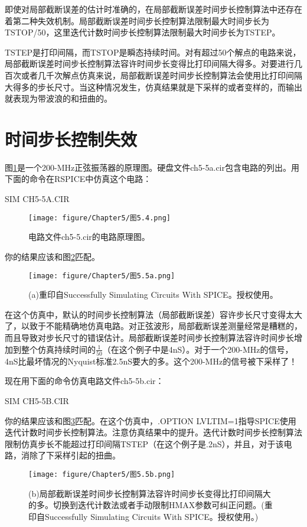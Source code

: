 即使对局部截断误差的估计时准确的，在局部截断误差时间步长控制算法中还存在着第二种失效机制。局部截断误差时间步长控制算法限制最大时间步长为TSTOP/50，这里迭代计数时间步长控制算法限制最大时间步长为TSTEP。

TSTEP是打印间隔，而TSTOP是瞬态持续时间。对有超过50个解点的电路来说，局部截断误差时间步长控制算法容许时间步长变得比打印间隔大得多。对要进行几百次或者几千次解点仿真来说，局部截断误差时间步长控制算法会使用比打印间隔大得多的步长尺寸。当这种情况发生，仿真结果就是下采样的或者变样的，而输出就表现为带波浪的和扭曲的。

\section{时间步长控制失效}
图\ref{图5.4}是一个200-MHz正弦振荡器的原理图。硬盘文件ch5-5a.cir包含电路的列出。用下面的命令在RSPICE中仿真这个电路：

SIM CH5-5A.CIR

\begin{figure}[htbp]
\small
    \centering
    \texttt{[image: figure/Chapter5/图5.4.png]}
    \caption{电路文件ch5-5.cir的电路原理图。}
    \label{图5.4}
\end{figure}

你的结果应该和图\ref{图5.5a}匹配。
\begin{figure}[htbp]
\small
    \centering
    \texttt{[image: figure/Chapter5/图5.5a.png]}
    \caption{(a)重印自Successfully Simulating Circuits With SPICE。授权使用。}
    \label{图5.5a}
\end{figure}

在这个仿真中，默认的时间步长控制算法（局部截断误差）容许步长尺寸变得太大了，以致于不能精确地仿真电路。对正弦波形，局部截断误差测量经常是糟糕的，而且导致对步长尺寸的错误估计。局部截断误差时间步长控制算法容许时间步长增加到整个仿真持续时间的$\frac{1}{50}$（在这个例子中是4nS）。对于一个200-MHz的信号，4nS比最坏情况的Nyquist标准2.5nS要大的多。这个200-MHz的信号被下采样了！

现在用下面的命令仿真电路文件ch5-5b.cir：

SIM CH5-5B.CIR

你的结果应该和图\ref{图5.5b}匹配。在这个仿真中，.OPTION LVLTIM=1指导SPICE使用迭代计数时间步长控制算法。注意仿真结果中的提升。迭代计数时间步长控制算法限制仿真步长不能超过打印间隔TSTEP（在这个例子是.2nS），并且，对于该电路，消除了下采样引起的扭曲。

\begin{figure}[htbp]
\small
    \centering
    \texttt{[image: figure/Chapter5/图5.5b.png]}
    \caption{(b)局部截断误差时间步长控制算法容许时间步长变得比打印间隔大的多。切换到迭代计数法或者手动限制HMAX参数可纠正问题。(重印自Successfully Simulating Circuits With SPICE。授权使用。)}
    \label{图5.5b}
\end{figure}

